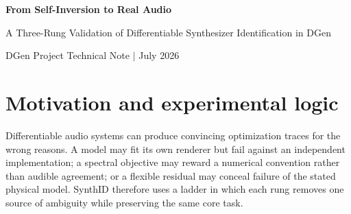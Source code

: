 \documentclass[10pt]{article}
\begin{document}
\begin{center}
  {\color{navy}\LARGE\bfseries From Self-Inversion to Real Audio}\par
  \vspace{4pt}
  {\large A Three-Rung Validation of Differentiable Synthesizer Identification in DGen}\par
  \vspace{10pt}
  {\small DGen Project Technical Note \quad $\vert$  July 2026}
\end{center}

\vspace{4pt}
\begin{abstract}
This note reports a three-rung validation of SynthID, a differentiable system-identification example built on DGen. The same compact drum-synthesizer topology is tested under progressively stronger sources of evidence: recovery of hidden parameters from a DGen-generated target, recovery from an independently rendered target, and fitting a real TR-808 kick recording. The ladder is designed to separate three questions that are often conflated: whether gradients traverse the complete signal path, whether apparent success is merely shared-implementation self-consistency, and whether the method is useful on measured audio. Rung 1 passes four of five deterministic seeds, Rung 2 passes four of five seeds while all independent-renderer equivalence checks remain below $5.12\times10^{-6}$ maximum absolute error, and Rung 3 reduces a corrected independent multi-resolution STFT distance from $0.07525$ to $0.01163$, an $84.55\%$ improvement against an $80\%$ requirement. The final real-audio fit uses only fourteen interpretable scalars and no learned residual, lookup table, FIR, or target-seeded waveform. Together, the results demonstrate end-to-end differentiability, cross-implementation validity, and useful low-dimensional identification on a real recording, while leaving open broader generalization, perceptual validation, and richer instrument classes.
\end{abstract}

\section{Motivation and experimental logic}

Differentiable audio systems can produce convincing optimization traces for the wrong reasons. A model may fit its own renderer but fail against an independent implementation; a spectral objective may reward a numerical convention rather than audible agreement; or a flexible residual may conceal failure of the stated physical model. SynthID therefore uses a ladder in which each rung removes one source of ambiguity while preserving the same core task.
\end{document}
